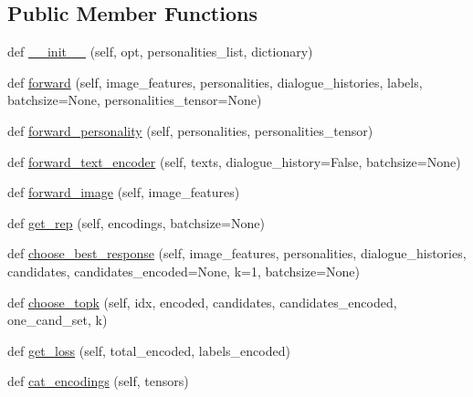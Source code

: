 \subsection*{Public Member Functions}
\begin{DoxyCompactItemize}
\item 
def \hyperlink{classprojects_1_1image__chat_1_1transresnet__multimodal_1_1modules_1_1TransresnetMultimodalModel_acce33a563010f01d7abf3b9def603119}{\+\_\+\+\_\+init\+\_\+\+\_\+} (self, opt, personalities\+\_\+list, dictionary)
\item 
def \hyperlink{classprojects_1_1image__chat_1_1transresnet__multimodal_1_1modules_1_1TransresnetMultimodalModel_a9e5dd2a418ccbbe70d1b7f8ae3be78ed}{forward} (self, image\+\_\+features, personalities, dialogue\+\_\+histories, labels, batchsize=None, personalities\+\_\+tensor=None)
\item 
def \hyperlink{classprojects_1_1image__chat_1_1transresnet__multimodal_1_1modules_1_1TransresnetMultimodalModel_af645957261121c6c5a99ffc1f7e44f1e}{forward\+\_\+personality} (self, personalities, personalities\+\_\+tensor)
\item 
def \hyperlink{classprojects_1_1image__chat_1_1transresnet__multimodal_1_1modules_1_1TransresnetMultimodalModel_a0dbaa08f20aed129c58237d8d7575197}{forward\+\_\+text\+\_\+encoder} (self, texts, dialogue\+\_\+history=False, batchsize=None)
\item 
def \hyperlink{classprojects_1_1image__chat_1_1transresnet__multimodal_1_1modules_1_1TransresnetMultimodalModel_ab6a9e6cfce463a5011e52f9740e70d4f}{forward\+\_\+image} (self, image\+\_\+features)
\item 
def \hyperlink{classprojects_1_1image__chat_1_1transresnet__multimodal_1_1modules_1_1TransresnetMultimodalModel_a0dc7c4c9b5b395f3f5af7547d13d3425}{get\+\_\+rep} (self, encodings, batchsize=None)
\item 
def \hyperlink{classprojects_1_1image__chat_1_1transresnet__multimodal_1_1modules_1_1TransresnetMultimodalModel_a528f9ad05ca6c0f0932b13b404ee054b}{choose\+\_\+best\+\_\+response} (self, image\+\_\+features, personalities, dialogue\+\_\+histories, candidates, candidates\+\_\+encoded=None, k=1, batchsize=None)
\item 
def \hyperlink{classprojects_1_1image__chat_1_1transresnet__multimodal_1_1modules_1_1TransresnetMultimodalModel_a16771c029f996c0aa05a773000e40a11}{choose\+\_\+topk} (self, idx, encoded, candidates, candidates\+\_\+encoded, one\+\_\+cand\+\_\+set, k)
\item 
def \hyperlink{classprojects_1_1image__chat_1_1transresnet__multimodal_1_1modules_1_1TransresnetMultimodalModel_a80dacb736b29beb2ed05e72f6ff6375e}{get\+\_\+loss} (self, total\+\_\+encoded, labels\+\_\+encoded)
\item 
def \hyperlink{classprojects_1_1image__chat_1_1transresnet__multimodal_1_1modules_1_1TransresnetMultimodalModel_aff6ec96c67c791d1adbc7ca4043805fc}{cat\+\_\+encodings} (self, tensors)
\end{DoxyCompactItemize}
